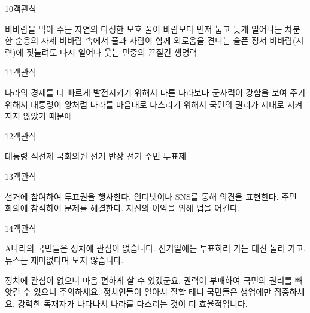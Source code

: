\documentclass[fs95,seriesFre]{korfarm-base}
\begin{document}
\begin{kfQBlock}{10}{객관식}
\begin{kfChoices}
\kfChoice 비바람을 막아 주는 자연의 다정한 보호
\kfChoice 풀이 바람보다 먼저 눕고 늦게 일어나는 차분한 순응의 자세
\kfChoice 비바람 속에서 풀과 사람이 함께 외로움을 견디는 슬픈 정서
\kfChoice 비바람(시련)에 짓눌려도 다시 일어나 웃는 민중의 끈질긴 생명력
\end{kfChoices}
\end{kfQBlock}

\begin{kfQBlock}{11}{객관식}
\begin{kfChoices}
\kfChoice 나라의 경제를 더 빠르게 발전시키기 위해서
\kfChoice 다른 나라보다 군사력이 강함을 보여 주기 위해서
\kfChoice 대통령이 왕처럼 나라를 마음대로 다스리기 위해서
\kfChoice 국민의 권리가 제대로 지켜지지 않았기 때문에
\end{kfChoices}
\end{kfQBlock}

\begin{kfQBlock}{12}{객관식}
\begin{kfChoices}
\kfChoice 대통령 직선제
\kfChoice 국회의원 선거
\kfChoice 반장 선거
\kfChoice 주민 투표제
\end{kfChoices}
\end{kfQBlock}

\begin{kfQBlock}{13}{객관식}
\begin{kfChoices}
\kfChoice 선거에 참여하여 투표권을 행사한다.
\kfChoice 인터넷이나 SNS를 통해 의견을 표현한다.
\kfChoice 주민 회의에 참석하여 문제를 해결한다.
\kfChoice 자신의 이익을 위해 법을 어긴다.
\end{kfChoices}
\end{kfQBlock}

\begin{kfQBlock}{14}{객관식}
\begin{kfEvidence}A나라의 국민들은 정치에 관심이 없습니다. 선거일에는 투표하러 가는 대신 놀러 가고, 뉴스는 재미없다며 보지 않습니다.\end{kfEvidence}
\begin{kfChoices}
\kfChoice 정치에 관심이 없으니 마음 편하게 살 수 있겠군요.
\kfChoice 권력이 부패하여 국민의 권리를 빼앗길 수 있으니 주의하세요.
\kfChoice 정치인들이 알아서 잘할 테니 국민들은 생업에만 집중하세요.
\kfChoice 강력한 독재자가 나타나서 나라를 다스리는 것이 더 효율적입니다.
\end{kfChoices}
\end{kfQBlock}
\end{document}

